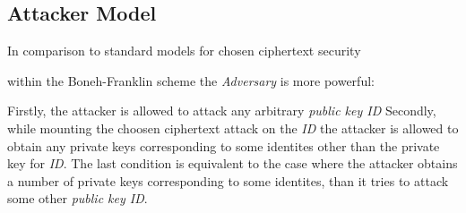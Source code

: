 \subsection{Attacker Model}

In comparison to standard models for chosen ciphertext security

within the Boneh-Franklin scheme the \textit{Adversary}
is more powerful:


    Firstly, the attacker is allowed to attack any arbitrary \textit{public key ID}
    Secondly, while mounting  the choosen ciphertext attack on the \textit{ID}
    the attacker is allowed to obtain any private keys corresponding to some
    identites other than the private key for \textit{ID}. The last
    condition is equivalent to the case where the attacker obtains a number
    of private keys corresponding to some identites, than it tries to attack
    some other \textit{public key ID}.







